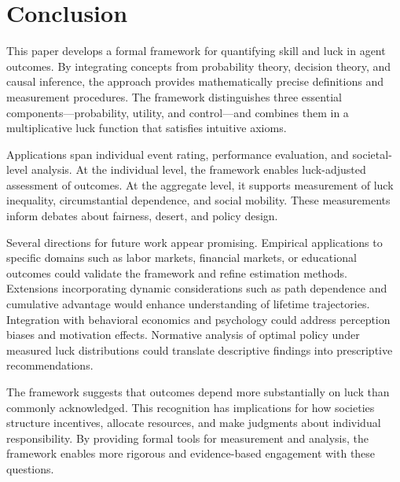 \section{Conclusion}
\label{sec:conclusion}

This paper develops a formal framework for quantifying skill and luck in
agent outcomes. By integrating concepts from probability theory, decision
theory, and causal inference, the approach provides mathematically precise
definitions and measurement procedures. The framework distinguishes
three essential components—probability, utility, and control—and
combines them in a multiplicative luck function that satisfies intuitive
axioms.

Applications span individual event rating, performance evaluation, and
societal-level analysis. At the individual level, the framework enables
luck-adjusted assessment of outcomes. At the aggregate level, it
supports measurement of luck inequality, circumstantial dependence, and
social mobility. These measurements inform debates about fairness,
desert, and policy design.

Several directions for future work appear promising. Empirical
applications to specific domains such as labor markets, financial markets,
or educational outcomes could validate the framework and refine
estimation methods. Extensions incorporating dynamic considerations such
as path dependence and cumulative advantage would enhance understanding of
lifetime trajectories. Integration with behavioral economics and
psychology could address perception biases and motivation effects. Normative
analysis of optimal policy under measured luck distributions could translate
descriptive findings into prescriptive recommendations.

The framework suggests that outcomes depend more substantially on luck than
commonly acknowledged. This recognition has implications for how
societies structure incentives, allocate resources, and make judgments
about individual responsibility. By providing formal tools for measurement
and analysis, the framework enables more rigorous and evidence-based
engagement with these questions.